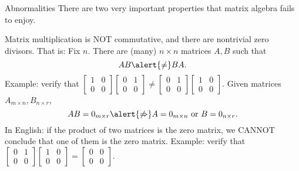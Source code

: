 \begin{frame}{Abnormalities}
There are two very important properties that matrix algebra fails to enjoy. 
\begin{theorem}
Matrix multiplication is NOT \alert{commutative}, and there are nontrivial \alert{zero divisors}. That is: 
\bb
\pause\ii Fix $n$. There are (many) $n\times n$ matrices $A, B$ such that 
\[
AB\alert{\ne}BA.
\]
\alert{Example:} verify that 
$\begin{bmatrix}
1&0\\
0&0
\end{bmatrix}
\begin{bmatrix}
0&1\\
0&0
\end{bmatrix}
\ne
\begin{bmatrix}
0&1\\
0&0
\end{bmatrix}
\begin{bmatrix}
1&0\\
0&0
\end{bmatrix}.
$
\pause\ii Given matrices $A_{m\times n}, B_{n\times r}$, 
\[
AB=0_{m\times r}\alert{\not\Rightarrow} A=0_{m\times n} \text{ or } B=0_{n\times r}.
\]
In English: if the product of two matrices is the zero matrix, we CANNOT conclude that one of them is the zero matrix. 
\bpause
\alert{Example:} verify that 
$
\begin{bmatrix}
0&1\\
0&0
\end{bmatrix}
\begin{bmatrix}
1&0\\
0&0
\end{bmatrix}
=\begin{bmatrix}
0&0\\ 0&0
\end{bmatrix}.
$
\ee 
\end{theorem}
\end{frame}
